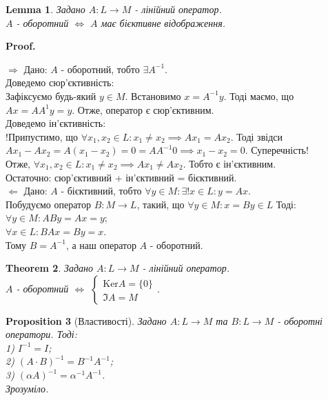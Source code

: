 \documentclass[a4paper, 10pt]{article}
\makeatletter
\def\qed{$\blacksquare$}
\def\ker#1{\textrm{Ker} {#1}}
\def\rightproof{$\boxed{\Rightarrow}$ }
\def\leftproof{$\boxed{\Leftarrow}$ }
\theoremstyle{theoremdd}
\newtheorem{theorem}{Theorem}[subsection]
\theoremstyle{theoremdd}
\theoremstyle{theoremdd}
\theoremstyle{theoremdd}
\theoremstyle{theoremdd}
\newtheorem{proposition}[theorem]{Proposition}
\theoremstyle{theoremdd}
\theoremstyle{theoremdd}
\newtheorem{lemma}[theorem]{Lemma}
\theoremstyle{theoremdd}
\renewenvironment{proof}[1][Proof.\\]{\par
\pushQED{\hfill \qed}%
\normalfont \topsep6\p@\@plus6\p@\relax
\trivlist
\item\relax
{\bfseries
#1\@addpunct{.}}\hspace\labelsep\ignorespaces
}{%
\popQED\endtrivlist\@endpefalse
}
\makeatother
\begin{document}
	\begin{lemma}
	Задано $A: L \to M$ - лінійний оператор.\\
	$A$ - оборотний $\iff$ $A$ має бієктивне відображення.
	\end{lemma}
	
	\begin{proof}
	\rightproof Дано: $A$ - оборотний, тобто $\exists A^{-1}$.\\
	Доведемо сюр'єктивність:\\
	Зафіксуємо будь-який $y \in M$. Встановимо $x = A^{-1}y$. Тоді маємо, що $Ax = AA^{1}y = y$. Отже, оператор є сюр'єктивним.\\
	Доведемо ін'єктивність:\\
	!Припустимо, що $\forall x_1,x_2 \in L: x_1 \neq x_2 \implies Ax_1 = Ax_2$. Тоді звідси $Ax_1 - Ax_2 = A(x_1-x_2)=0=AA^{-1}0 \implies x_1 - x_2 = 0$. Суперечність! \\
	Отже, $\forall x_1,x_2 \in L: x_1 \neq x_2 \implies Ax_1 \neq Ax_2$. Тобто є ін'єктивним.\\
	Остаточно: сюр'єктивний + ін'єктивний = бієктивний.
	\bigskip \\
	\leftproof Дано: $A$ - бієктивний, тобто $\forall y \in M: \exists! x \in L: y=  Ax$.\\
	Побудуємо оператор $B: M \to L$, такий, що $\forall y \in M: x = By \in L$ Тоді:\\
	$\forall y \in M: ABy = Ax = y$;\\
	$\forall x \in L: BAx = By = x$.\\
	Тому $B = A^{-1}$, а наш оператор $A$ - оборотний.
	\end{proof}
	
	\begin{theorem}
	Задано $A: L \to M$ - лінійний оператор.\\
	$A$ - оборотний $\iff$ $\begin{cases} \ker A = \{0\} \\ \Im A = M \end{cases}$.
	\end{theorem}
	
	\begin{proposition}[Властивості]
	Задано $A: L \to M$ та $B: L \to M$ - оборотні оператори. Тоді:\\
	1) $I^{-1} = I$;\\
	2) $(A \cdot B)^{-1} = B^{-1} A^{-1}$;\\
	3) $(\alpha A)^{-1} = \alpha^{-1} A^{-1}$.\\
	\textit{Зрозуміло.}
	\end{proposition}
	
\end{document}
